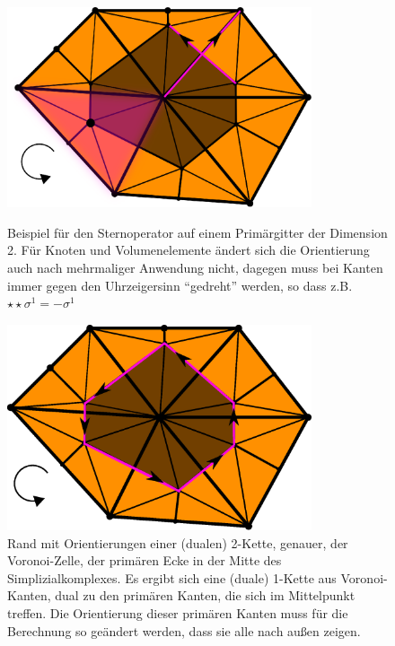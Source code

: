   \begin{figure}
    \centering\includegraphics[width=0.8\textwidth]{bilder/dualSigma0.eps}
    \caption[Bsp. Sternoperator in 2D]{Beispiel für den Sternoperator auf einem Primärgitter der Dimension 2.
                                       Für Knoten und Volumenelemente ändert sich die Orientierung auch nach mehrmaliger Anwendung nicht,
                                       dagegen muss bei Kanten immer gegen den Uhrzeigersinn "`gedreht"' werden, so dass z.B. \( \star\star\sigma^{1} = -\sigma^{1} \)}
    \label{figBspSternoperator2D}
    \vspace{1cm}
    \centering\includegraphics[width=0.8\textwidth]{bilder/dualSigmaRand.eps}
    \caption[Bsp. Randoperator auf (dualen) 2-Kette]{Rand mit Orientierungen einer (dualen) 2-Kette, genauer, der Voronoi-Zelle, der primären Ecke in der Mitte des Simplizialkomplexes.
                                                     Es ergibt sich eine (duale) 1-Kette aus Voronoi-Kanten, dual zu den primären Kanten, die sich im Mittelpunkt treffen.
                                                     Die Orientierung dieser primären Kanten muss für die Berechnung so geändert werden, dass sie alle nach außen zeigen.}
    \label{figBspRandAufDualZelle}
  \end{figure}

